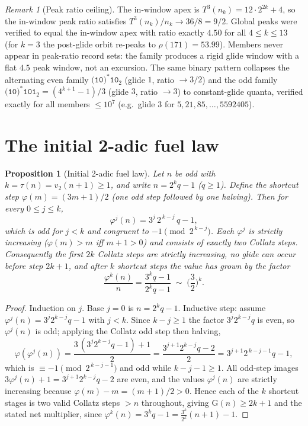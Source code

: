 \documentclass[11pt]{article}
\newtheorem{proposition}[theorem]{Proposition}
\theoremstyle{remark}
\newtheorem{remark}{Remark}
\newcommand{\T}{T}
\newcommand{\vtwo}{v_2}
\begin{document}
\begin{remark}[Peak ratio ceiling]
The in-window apex is $\T^3(n_k) = 12\cdot 2^{2k} + 4$, so the in-window
peak ratio satisfies $\T^3(n_k)/n_k \to 36/8 = 9/2$. Global peaks were
verified to equal the in-window apex with ratio exactly $4.50$ for all
$4 \le k \le 13$ (for $k = 3$ the post-glide orbit re-peaks to
$\rho(171) = 53.99$). Members never appear in peak-ratio record sets:
the family produces a rigid glide window with a flat $4.5$ peak window,
not an excursion. The same binary pattern collapses the alternating even
family $\texttt{(10)}^*\texttt{10}_2$ (glide $1$, ratio $\to 3/2$) and the
odd family $\texttt{(10)}^*\texttt{101}_2 = (4^{k+1}-1)/3$ (glide $3$,
ratio $\to 3$) to constant-glide quanta, verified exactly for all
members $\le 10^7$ (e.g.\ glide $3$ for $5, 21, 85, \dots, 5592405$).
\end{remark}

\section{The initial 2-adic fuel law}
\label{sec:fuel}

\begin{proposition}[Initial 2-adic fuel law]
\label{prop:fuel}
Let $n$ be odd with $k = \tau(n) = \vtwo(n+1) \ge 1$, and write
$n = 2^k q - 1$ ($q \ge 1$). Define the \emph{shortcut step}
$\varphi(m) = (3m+1)/2$ (one odd step followed by one halving). Then for
every $0 \le j \le k$,
\[
  \varphi^{j}(n) = 3^{j}\, 2^{\,k-j}\, q - 1,
\]
which is odd for $j < k$ and congruent to $-1 \pmod{2^{\,k-j}}$. Each
$\varphi^{j}$ is strictly increasing ($\varphi(m) > m$ iff $m + 1 > 0$) and
consists of exactly two Collatz steps. Consequently the first $2k$ Collatz
steps are strictly increasing, no glide can occur before step $2k+1$,
and after $k$ shortcut steps the value has grown by the factor
\[
  \frac{\varphi^k(n)}{n} = \frac{3^k q - 1}{2^k q - 1} \;\sim\; \Big(\frac{3}{2}\Big)^{k}.
\]
\end{proposition}

\begin{proof}
Induction on $j$. Base $j = 0$ is $n = 2^k q - 1$. Inductive step:
assume $\varphi^j(n) = 3^j 2^{k-j} q - 1$ with $j < k$. Since $k - j \ge 1$
the factor $3^j 2^{k-j} q$ is even, so $\varphi^j(n)$ is odd; applying the
Collatz odd step then halving,
\[
  \varphi(\varphi^j(n)) = \frac{3\,(3^j 2^{k-j} q - 1) + 1}{2}
  = \frac{3^{j+1} 2^{k-j} q - 2}{2}
  = 3^{j+1} 2^{\,k-j-1} q - 1,
\]
which is $\equiv -1 \pmod{2^{\,k-j-1}}$ and odd while $k - j - 1 \ge 1$.
All odd-step images $3\varphi^j(n) + 1 = 3^{j+1} 2^{k-j} q - 2$ are even,
and the values $\varphi^j(n)$ are strictly increasing because
$\varphi(m) - m = (m+1)/2 > 0$. Hence each of the $k$ shortcut stages is
two valid Collatz steps $> n$ throughout, giving $\mathrm{G}(n) \ge 2k + 1$
and the stated net multiplier, since
$\varphi^k(n) = 3^k q - 1 = \frac{3^k}{2^k}(n + 1) - 1$.
\end{proof}
\end{document}
